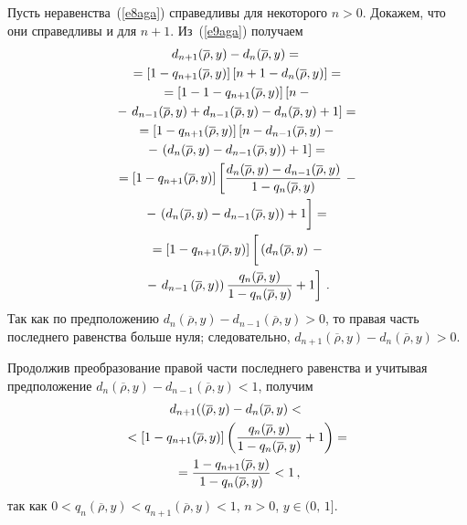 \begin{multicols}{2}
    Пусть неравенства~(\ref{e8aga}) справедливы для некоторого $n > 0$. 
Докажем, что они справедливы и для $n + 1$. Из~(\ref{e9aga}) получаем
\begin{multline*}
d_{n+1}(\overline{\rho},y)- d_n(\overline{\rho},y)={}\\
{}=\left [ 1-
q_{n+1}(\overline{\rho},y)\right ] \left [n+1-d_n(\overline{\rho},y)\right ] ={}\\
{}= \left [ 1-
1-q_{n+1}(\overline{\rho},y)\right ] \left [ n-{}\right.\\
{}-\left. d_{n-1}(\overline{\rho},y)+d_{n-1}(\overline{\rho},y)-
d_n(\overline{\rho},y)+1\right ] ={}\\
{}=\left [ 1-q_{n+1}(\overline{\rho},y)\right ] 
\left [ n-d_{n-1}(\overline{\rho},y)-{}\right.\\
{}-\left. \left ( d_n(\overline{\rho},y)-d_{n-1}(\overline{\rho},y)\right )+1\right] = {}\\
{}=
\left [ 1-q_{n+1}(\overline{\rho},y)\right ]
\left [ 
\fr{d_n(\overline{\rho},y) -d_{n-1}(\overline{\rho},y)}{1-
q_n(\overline{\rho},y)}\right.-{}\\
{}-\left.
\left ( d_n(\overline{\rho},y)-d_{n-1}(\overline{\rho},y)\right )+1
\vphantom{\fr{d_n(\overline{\rho})}{(q_n)}}
\right ]={}\\
{}=
\left [ 1-q_{n+1}(\overline{\rho},y)\right ]
\left [ 
\vphantom{\fr{d_n(\overline{\rho})}{(q_n)}}
\left ( d_n(\overline{\rho},y\right)\right. -{}\\
 {}-\left.
d_{n-1}\left(\overline{\rho},y)\right )\fr{q_n(\overline{\rho},y)}{1-
q_n(\overline{\rho},y)}+1\right ]\,.
\end{multline*}
Так как по предположению $d_n (\overline{\rho},y) -d_{n-1}(\overline{\rho},y) 
>0$, то правая часть последнего равенства больше нуля; следовательно, 
$d_{n+1}(\overline{\rho},y)-d_n(\overline{\rho},y)>0$. 

    Продолжив преобразование правой части последнего равенства и 
учитывая предположение $d_n(\overline{\rho},y) -d_{n-1}(\overline{\rho},y)<1$, 
получим
\begin{multline*}
d_{n+1}((\overline{\rho},y) -d_n(\overline{\rho},y)<{}\\
{}< \left [ 1-
q_{n+1}(\overline{\rho},y)\right ]
\left ( \displaystyle\frac{\displaystyle q_n(\overline{\rho},y)\mathstrut}{\displaystyle 1-q_n(\overline{\rho},y)\mathstrut}+1\right )={}\\
{}=
\displaystyle\frac{\displaystyle 1-q_{n+1}(\overline{\rho},y)\mathstrut}{\displaystyle 1-q_n(\overline{\rho},y)\mathstrut}<1\,,
\end{multline*}
так как $0< q_n(\overline{\rho},y)<q_{n+1}(\overline{\rho},y)<1$, $n>0$, $y\in 
(0,\,1]$.


\end{multicols}
